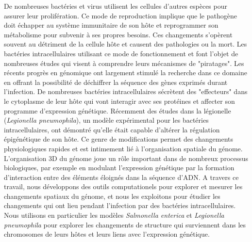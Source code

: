 De nombreuses bactéries et virus utilisent les cellules d'autres espèces pour assurer leur prolifération. Ce mode de reproduction implique que le pathogène doit échapper au système immunitaire de son hôte et reprogrammer son métabolisme pour subvenir à ses propres besoins. Ces changements s'opèrent souvent au détriment de la cellule hôte et causent des pathologies ou la mort. Les bactéries intracellulaires utilisant ce mode de fonctionnement et font l'objet de nombreuses études qui visent à comprendre leurs mécanismes de "piratages". Les récents progrès en génomique ont largement stimulé la recherche dans ce domaine en offrant la possibilité de déchiffrer la séquence des gènes exprimés durant l'infection. De nombreuses bactéries intracellulaires sécrètent des "effecteurs" dans le cytoplasme de leur hôte qui vont interagir avec ses protéines et affecter son programme d'expression génétique. Récemment des études dans la légionelle (\textit{Legionella pneumophila}), un modèle expérimental pour les bactéries intracellulaires, ont démontré qu'elle était capable d'altérer la régulation épigénétique de son hôte. Ce genre de modifications permet des changements physiologiques rapides et est intimement lié à l'organisation spatiale du génome. L'organisation 3D du génome joue un rôle important dans de nombreux processus biologiques, par exemple en modulant l'expression génétique par la formation d'interaction entre des éléments éloignés dans la séquence d'ADN. A travers ce travail, nous développons des outils computationels pour explorer et mesurer les changements spatiaux du génome, et nous les exploitons pour étudier les changements qui ont lieu pendant l'infection par des bactéries intracellulaires. Nous utilisons en particulier les modèles \textit{Salmonella enterica } et \textit{Legionella pneumophila} pour explorer les changements de structure qui surviennent dans les chromosomes de leurs hôtes et leurs liens avec l'expression génétique.
